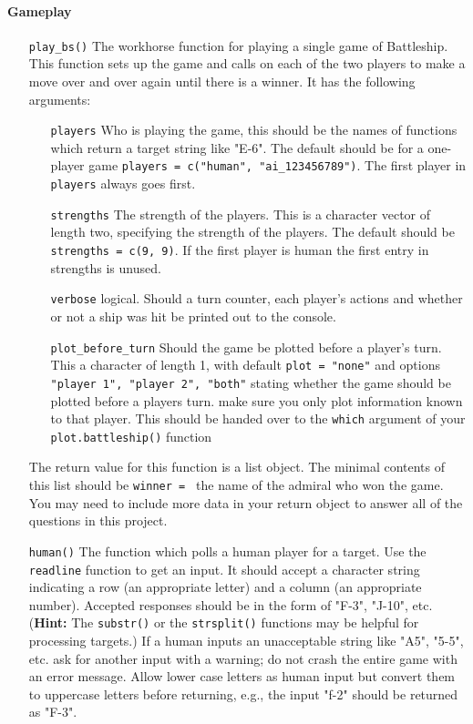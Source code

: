 \documentclass[
]{article}
\begin{document}
\paragraph{Gameplay}\label{gameplay}

\begin{itemize}
  \item[\texttt{play\_bs()}] The workhorse function for playing a single game of Battleship. This function sets up the game and calls on each of the two players to make a move over and over again until there is a winner. It has the following arguments:
    \begin{itemize}
      \item[\texttt{players}] Who is playing the game, this should be the names of functions which return a target string like "E-6". The default should be for a one-player game \texttt{players = c("human", "ai\_123456789")}. The first player in \texttt{players} always goes first. 
      \item[\texttt{strengths}] The strength of the players. This is a character vector of length two, specifying the strength of the players. The default should be \texttt{strengths = c(9, 9)}. If the first player is human the first entry in strengths is unused.
      \item[\texttt{verbose}] logical. Should a turn counter, each player's actions and whether or not a ship was hit be printed out to the console.
      \item[\texttt{plot\_before\_turn}] Should the game be plotted before a player's turn. This a character of length 1, with default \texttt{plot = "none"} and options \texttt{"player 1", "player 2", "both"} stating whether the game should be plotted before a players turn. make sure you only plot information known to that player. This should be handed over to the \texttt{which} argument of your \texttt{plot.battleship()} function
    \end{itemize}
  The return value for this function is a list object. The minimal contents of this list should be \texttt{winner = } the name of the admiral who won the game. You may need to include more data in your return object to answer all of the questions in this project.
  
\item[\texttt{human()}] The function which polls a human player for a target. Use the \texttt{readline} function to get an input. It should accept a character string indicating a row (an appropriate letter) and a column (an appropriate number). Accepted responses should be in the form of "F-3", "J-10", etc. (\textbf{Hint:} The \texttt{substr()} or the \texttt{strsplit()} functions may be helpful for processing targets.) If a human inputs an unacceptable string like "A5", "5-5", etc. ask for another input with a warning; do not crash the entire game with an error message. Allow lower case letters as human input but convert them to uppercase letters before returning, e.g., the input "f-2" should be returned as "F-3".


\end{itemize}
\end{document}
